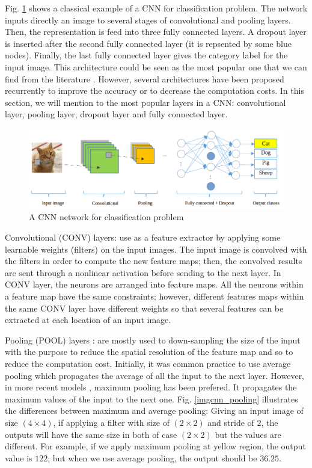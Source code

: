 \documentclass[review]{elsarticle}
\begin{document}
Fig. \ref{imgcnn_network} shows a classical example of a CNN for classification problem. The network inputs directly an image to several stages of convolutional and pooling layers. Then, the representation is feed into three fully connected layers. A dropout layer is inserted after the second fully connected layer (it is repsented by some blue nodes). Finally, the last fully connected layer gives the category label for the input image. This architecture could be seen as the most popular one that we can find from the literature \cite{lecun1998gradient, krizhevsky2012imagenet}. However, several architectures have been proposed recurrently to improve the accuracy or to decrease the computation costs. In this section, we will mention to the most popular layers in a CNN: convolutional layer, pooling layer, dropout layer and fully connected layer.

\begin{figure}[!h]
	\centering
	\includegraphics[scale=.3]{images/cnn_network_2}
	\caption{A CNN network for classification problem}
	\label{imgcnn_network}
\end{figure}

Convolutional (CONV) layers: use as a feature extractor by applying some learnable weights (filters) on the input images. The input image is convolved with the filters in order to compute the new feature maps; then, the convolved results are sent through a nonlinear activation before sending to the next layer. In CONV layer, the neurons are arranged into feature maps. All the neurons within a feature map have the same constraints; however, different features maps within the same CONV layer have different weights so that several features can be extracted at each location of an input image. 

Pooling (POOL) layers : are mostly used to down-sampling the size of the input with the purpose to reduce the spatial resolution of the feature map and so to reduce the computation cost. Initially, it was common practice to use average pooling which propagates the average of all the input to the next layer. However, in more recent models \cite{krizhevsky2012imagenet, ciregan2012multi, li2015convolutional}, maximum pooling has been prefered. It propagates the maximum values of the input to the next one. Fig. \ref{imgcnn_pooling} illustrates the differences between maximum and average pooling: Giving an input image of size $(4 \times 4)$, if applying a filter with size of $(2 \times 2)$ and stride of $2$, the outputs will have the same size in both of case $(2 \times 2)$ but the values are different. For example, if we apply maximum pooling at yellow region, the output value is $122$; but when we use average pooling, the output should be $36.25$.
\end{document}
